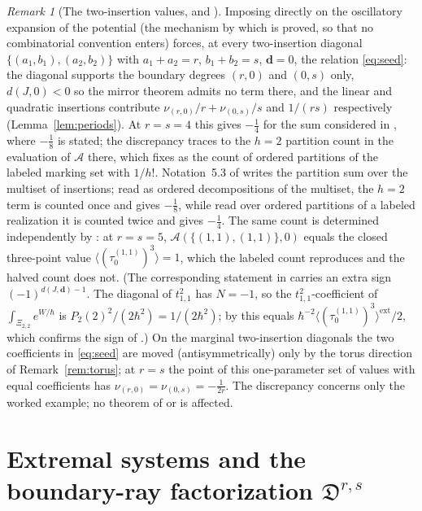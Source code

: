 \documentclass[11pt]{amsart}
\theoremstyle{definition}
\theoremstyle{remark}
\newtheorem{remark}[theorem]{Remark}
\newcommand{\Dscr}{\mathfrak{D}}
\newcommand{\Ascr}{\mathcal{A}}
\begin{document}
\begin{remark}[The two-insertion values, and {\cite[Ex.~5.5]{GKTsurvey}}]
\label{rem:ex55}
Imposing \cite[Thm.~0.3]{GKT} directly on the oscillatory expansion of the
potential (the mechanism by which \cite[Thm.~0.2]{GKT} is proved, so that no
combinatorial convention enters) forces, at every two-insertion diagonal
$\{(a_{1},b_{1}),(a_{2},b_{2})\}$ with $a_{1}{+}a_{2}=r$, $b_{1}{+}b_{2}=s$,
$\mathbf d=0$, the relation \eqref{eq:seed}: the diagonal supports the boundary
degrees $(r,0)$ and $(0,s)$ only, $d(J,0)<0$ so the mirror theorem admits no term
there, and the linear and quadratic insertions contribute
$\nu_{(r,0)}/r+\nu_{(0,s)}/s$ and $1/(rs)$ respectively
(Lemma~\ref{lem:periods}).
At $r=s=4$ this gives $-\tfrac14$ for the sum considered in
\cite[Ex.~5.5]{GKTsurvey}, where $-\tfrac18$ is stated; the discrepancy traces to
the $h=2$ partition count in the evaluation of $\Ascr$ there, which
\cite[Notation~3.42 and Thm.~4.9]{GKT} fixes as the count of ordered partitions of the labeled
marking set with $1/h!$.  Notation~5.3 of \cite{GKTsurvey} writes the
partition sum over the multiset of insertions; read as ordered decompositions
of the multiset, the $h=2$ term is counted once and gives $-\tfrac18$, while
read over ordered partitions of a labeled realization it is counted twice and
gives $-\tfrac14$.  The same count is determined independently by
\cite[Cor.~5.11(3)]{GKT}: at $r=s=5$, $\Ascr(\{(1,1),(1,1)\},0)$ equals the closed
three-point value $\langle(\tau_{0}^{(1,1)})^{3}\rangle=1$, which the labeled
count reproduces and the halved count does not.  (The corresponding statement
in \cite[Cor.~0.6]{GKT} carries an extra sign $(-1)^{d(J,\mathbf d)-1}$.  The
diagonal of $t_{1,1}^2$ has $N=-1$, so the $t_{1,1}^2$-coefficient of
$\int_{\Xi_{2,2}}e^{W/\hbar}$ is $P_2(2)^2/(2\hbar^2)=1/(2\hbar^2)$; by
\cite[Thm.~0.3]{GKT} this equals $\hbar^{-2}\langle(\tau_{0}^{(1,1)})^{3}\rangle^{\mathrm{ext}}/2$,
which confirms the sign of \cite[Cor.~5.11(3)]{GKT}.) On
the marginal two-insertion diagonals the two
coefficients in \eqref{eq:seed} are moved (antisymmetrically) only by the torus
direction of Remark~\ref{rem:torus}; at $r=s$ the point of this
one-parameter set of values with equal coefficients has
$\nu_{(r,0)}=\nu_{(0,s)}=-\tfrac1{2r}$. The discrepancy concerns
only the worked example; no theorem of \cite{GKT} or \cite{GKTsurvey} is
affected.
\end{remark}

\section{Extremal systems and the boundary-ray factorization
\texorpdfstring{$\Dscr^{r,s}$}{D(r,s)}}
\label{sec:canonical}
\end{document}
